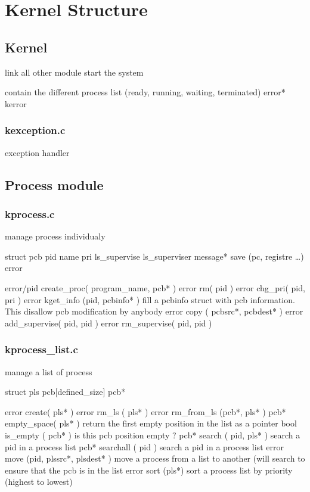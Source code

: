 \chapter{Kernel Structure}

\section{Kernel}

link all other module
start the system

contain the different process list (ready, running, waiting, terminated)
error*
kerror

\subsection{kexception.c}

exception handler

\section{Process module}

\subsection{kprocess.c}

manage process individualy

struct pcb {
 pid
 name
 pri
 ls_supervise
 ls_superviser
 message*
 save (pc, registre \ldots)
 error
}

error/pid create\_proc( program\_name, pcb* )
error rm( pid )
error chg\_pri( pid, pri ) 
error kget\_info (pid, pcbinfo* ) fill a pcbinfo  struct with pcb information. This disallow pcb modification by anybody
error copy ( pcbsrc*, pcbdest* )
error add\_supervise( pid, pid )
error rm\_supervise( pid, pid )

\subsection{kprocess\_list.c}

manage a list of process

struct pls {
 pcb[defined\_size]
 pcb*
}

error create( pls* ) 
error rm\_ls ( pls* )
error rm\_from\_ls (pcb*, pls* )
pcb* empty\_space( pls* ) return the first empty position in the list as a pointer
bool is\_empty ( pcb* ) is this pcb position empty ?
pcb* search ( pid, pls* ) search a pid in a process list
pcb* searchall ( pid ) search a pid in a process list
error move (pid, plssrc*, plsdest* ) move a process from a list to another (will search to ensure that the pcb is in the list
error sort (pls*) sort a process list by priority (highest to lowest)

